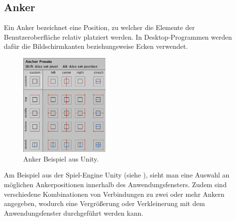 		\subsection{Anker}
			Ein Anker bezeichnet eine Position, zu welcher die Elemente der Benutzeroberfläche relativ platziert werden.
			In Desktop-Programmen werden dafür die Bildschirmkanten beziehungsweise Ecken verwendet.
			
			\begin{figure}[htbp]
				\centering
				\includegraphics[width=0.4\textwidth]{figures/Ui_Anchor_Unity.png}
				\caption{Anker Beispiel aus Unity.}
				\label{fig:unity}
			\end{figure}
			
			Am Beispiel aus der Spiel-Engine Unity (siehe ), sieht man eine Auswahl an möglichen Ankerpositionen innerhalb des Anwendungsfensters. Zudem sind verschiedene Kombinationen von Verbindungen zu zwei oder mehr Ankern angegeben, wodurch eine Vergrößerung oder Verkleinerung mit dem Anwendungsfenster durchgeführt werden kann.
	
